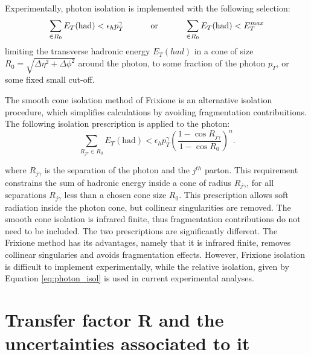 \documentclass[12pt,a4paper,openright,twoside]{report}
\begin{document}
Experimentally, photon isolation is implemented with the following selection:
\begin{equation}
\sum_{\in R_0} E_T(\text{had}) < \epsilon_h p_T^\gamma \text{\hspace{1cm} or \hspace{1cm}} \sum_{\in R_0} E_T(\text{had}) < E_T^{max}
\label{eq:photon_isol}
\end{equation}
limiting the transverse hadronic energy $E_T(had)$ in a cone of size $R_0 = \sqrt{\Delta\eta^2 + \Delta\phi^2}$ around the photon, to some fraction of the photon $p_T$, or some fixed small cut-off.

The smooth cone isolation method of Frixione \cite{frixione} is an alternative isolation procedure, which simplifies calculations by avoiding fragmentation contribuitions. The following isolation prescription is applied to the photon:
\begin{equation}
	\sum_{R_{j\gamma} \in R_0} E_T(\text{had}) < \epsilon_h p_T^\gamma \left(\frac{1-\cos R_{j\gamma}}{1-\cos R_0}\right)^n.
\label{eq:frix_isol}
\end{equation}

where $R_{j\gamma}$ is the separation of the photon and the $j^{th}$ parton. This requirement constrains the sum of hadronic energy inside a cone of radius $R_{j\gamma}$, for all separations $R_{j\gamma}$ less than a chosen cone size $R_0$. This prescription allows soft radiation inside the photon cone, but collinear singularities are removed. The smooth cone isolation is infrared finite, thus fragmentation contributions do not need to be included. The two prescriptions are significantly different. The Frixione method has its advantages, namely that it is infrared finite, removes collinear singularies and avoids fragmentation effects. However, Frixione isolation is difficult to implement experimentally, while the relative isolation, given by Equation \ref{eq:photon_isol} is used in current experimental analyses. 

\chapter{Transfer factor R and the uncertainties associated to it}\label{ch:Results}
\end{document}
